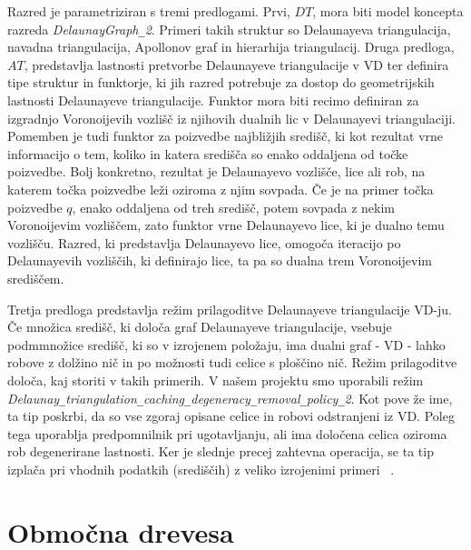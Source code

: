 \documentclass[a4paper, 12pt]{book}
\newcommand{\U}{\texttt{\_}}
\begin{document}
Razred je parametriziran s tremi predlogami. Prvi, $DT$, mora biti model koncepta razreda \textit{DelaunayGraph\U 2}. Primeri takih struktur so Delaunayeva triangulacija, navadna triangulacija, Apollonov graf in hierarhija triangulacij. Druga predloga, $AT$, predstavlja lastnosti pretvorbe Delaunayeve triangulacije v VD ter definira tipe struktur in funktorje, ki jih razred potrebuje za dostop do geometrijskih lastnosti Delaunayeve triangulacije. Funktor mora biti recimo definiran za izgradnjo Voronoijevih vozlišč iz njihovih dualnih lic v Delaunayevi triangulaciji. Pomemben je tudi funktor za poizvedbe najbližjih središč, ki kot rezultat vrne informacijo o tem, koliko in katera središča so enako oddaljena od točke poizvedbe. Bolj konkretno, rezultat je Delaunayevo vozlišče, lice ali rob, na katerem točka poizvedbe leži oziroma z njim sovpada. Če je na primer točka poizvedbe $q$, enako oddaljena od treh središč, potem sovpada z nekim Voronoijevim vozliščem, zato funktor vrne Delaunayevo lice, ki je dualno temu vozlišču. Razred, ki predstavlja Delaunayevo lice, omogoča iteracijo po Delaunayevih vozliščih, ki definirajo lice, ta pa so dualna trem Voronoijevim središčem.

Tretja predloga predstavlja režim prilagoditve Delaunayeve triangulacije VD-ju. 
Če množica središč, ki določa graf Delaunayeve triangulacije, vsebuje podmmnožice središč, ki so v izrojenem položaju, ima dualni graf - VD - lahko robove z dolžino nič in po možnosti tudi celice s ploščino nič. Režim prilagoditve določa, kaj storiti v takih primerih. V našem projektu smo uporabili režim \\ \textit{Delaunay\U triangulation\U caching\U degeneracy\U removal\U policy\U 2}. Kot pove že ime, ta tip poskrbi, da so vse zgoraj opisane celice in robovi odstranjeni iz VD. Poleg tega uporablja predpomnilnik pri ugotavljanju, ali ima določena celica oziroma rob degenerirane lastnosti. Ker je slednje precej zahtevna operacija, se ta tip izplača pri vhodnih podatkih (središčih) z veliko izrojenimi primeri ~\cite{cgal:k-vda2-15a}.
 
\section{Območna drevesa}
\end{document}
